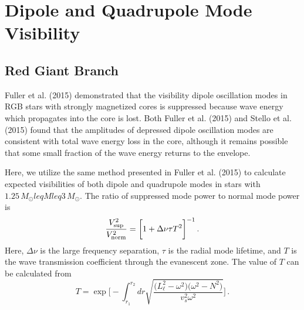 \section{Dipole and Quadrupole Mode Visibility}
\subsection{Red Giant Branch}

Fuller et al. (2015) demonstrated that the visibility dipole oscillation modes in RGB stars with strongly magnetized cores is suppressed because wave energy which propagates into the core is lost. Both Fuller et al. (2015) and Stello et al. (2015) found that the amplitudes of depressed dipole oscillation modes are consistent with total wave energy loss in the core, although it remains possible that some small fraction of the wave energy returns to the envelope.

Here, we utilize the same method presented in Fuller et al. (2015) to calculate expected visibilities of both dipole and quadrupole modes in stars with $1.25 \, M_\odot leq M leq 3 \, M_\odot$. The ratio of suppressed mode power to normal mode power is
\begin{equation}
\label{eqn:vsup}
\frac{V_{\rm sup}^2}{V_{\rm norm}^2} = \bigg[ 1 + \Delta \nu \tau T^2 \bigg]^{-1} \, .
\end{equation}
Here, $\Delta \nu$ is the large frequency separation, $\tau$ is the radial mode lifetime, and $T$ is the wave transmission coefficient through the evanescent zone. The value of $T$ can be calculated from
\begin{equation}
\label{eqn:T}
T  = \exp \bigg[ - \int^{r_2}_{r_1} dr \sqrt{ \frac{ \big( L_\ell^2 - \omega^2 \big) \big( \omega^2 - N^2 \big) }{v_s^2 \omega^2} } \bigg] \, .
\end{equation}
  